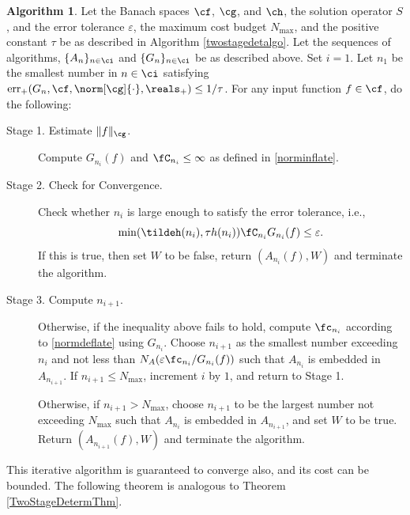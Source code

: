 \documentclass[]{elsarticle}
\DeclareMathOperator{\err}{err}
\theoremstyle{definition}
\newtheorem{algo}{Algorithm}
\theoremstyle{remark}
\begin{document}
\begin{algo} \label{multistagealgo}  Let the Banach spaces $\cf$, $\cg$, and $\ch$, the solution operator $S$, and the error tolerance $\varepsilon$, the maximum cost budget $N_{\max}$, and the positive constant $\tau$ be as described in Algorithm \ref{twostagedetalgo}. Let the sequences of algorithms, $\{A_n\}_{n \in \ci}$ and  $\{G_n\}_{n \in \ci}$ be as described above.  Set $i=1$.  Let $n_1$ be the smallest number in $n \in \ci$ satisfying $\err_+(G_n,\cf,\norm[\cg]{\cdot},\reals_+) \le 1/\tau$. For any input function $f \in \cf$, do the following:
\begin{description}

\item [Stage 1. Estimate $\| f \| _{\cg}$.] Compute $G_{n_i}(f)$ and $\fC_{n_i} \le \infty$ as defined in \eqref{norminflate}.  

\item [Stage 2. Check for Convergence.] Check whether $n_i$ is large enough to satisfy the error tolerance, i.e., 
\begin{equation} \label{multistageconv}
\min(\tildeh(n_i),\tau h(n_i))\fC_{n_i} G_{n_i}(f) \le \varepsilon.
\end{equation}
If this is true, then set $W$ to be false, return $(A_{n_i}(f),W)$ and terminate the algorithm.

\item[Stage 3. Compute $n_{i+1}$.]  Otherwise, if the inequality above fails to hold, compute $\fc_{n_i}$ according to \eqref{normdeflate} using $G_{n_i}$. Choose $n_{i+1}$ as the smallest number exceeding $n_i$ and not less than $N_{A}(\varepsilon \fc_{n_i}/G_{n_i}(f))$ such that $A_{n_{i}}$ is embedded in $A_{n_{i+1}}$. If $n_{i+1} \le N_{\max}$, increment $i$ by $1$, and return to Stage 1.  

Otherwise, if $n_{i+1} > N_{\max}$, choose $n_{i+1}$ to be the largest number not exceeding $N_{\max}$ such that $A_{n_{i}}$ is embedded in $A_{n_{i+1}}$, and set $W$ to be true. Return $(A_{n_{i+1}}(f),W)$ and terminate the algorithm.
\end{description}  
\end{algo}

This iterative algorithm is guaranteed to converge also, and its cost can be bounded.  The following theorem is analogous to Theorem \ref{TwoStageDetermThm}.
\end{document}
